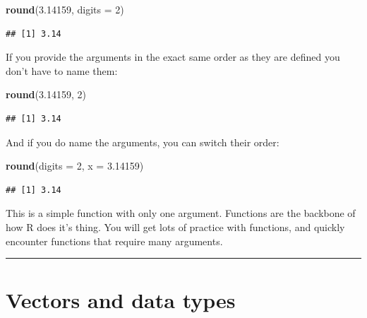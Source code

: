 \documentclass[
]{article}
\newenvironment{Shaded}{\begin{snugshade}}{\end{snugshade}}
\newcommand{\DataTypeTok}[1]{\textcolor[rgb]{0.13,0.29,0.53}{#1}}
\newcommand{\DecValTok}[1]{\textcolor[rgb]{0.00,0.00,0.81}{#1}}
\newcommand{\FloatTok}[1]{\textcolor[rgb]{0.00,0.00,0.81}{#1}}
\newcommand{\KeywordTok}[1]{\textcolor[rgb]{0.13,0.29,0.53}{\textbf{#1}}}
\newcommand{\NormalTok}[1]{#1}
\begin{document}
\begin{Shaded}
\begin{Highlighting}[]
\KeywordTok{round}\NormalTok{(}\FloatTok{3.14159}\NormalTok{, }\DataTypeTok{digits =} \DecValTok{2}\NormalTok{)}
\end{Highlighting}
\end{Shaded}

\begin{verbatim}
## [1] 3.14
\end{verbatim}

If you provide the arguments in the exact same order as they are defined
you don't have to name them:

\begin{Shaded}
\begin{Highlighting}[]
\KeywordTok{round}\NormalTok{(}\FloatTok{3.14159}\NormalTok{, }\DecValTok{2}\NormalTok{)}
\end{Highlighting}
\end{Shaded}

\begin{verbatim}
## [1] 3.14
\end{verbatim}

And if you do name the arguments, you can switch their order:

\begin{Shaded}
\begin{Highlighting}[]
\KeywordTok{round}\NormalTok{(}\DataTypeTok{digits =} \DecValTok{2}\NormalTok{, }\DataTypeTok{x =} \FloatTok{3.14159}\NormalTok{)}
\end{Highlighting}
\end{Shaded}

\begin{verbatim}
## [1] 3.14
\end{verbatim}

This is a simple function with only one argument. Functions are the
backbone of how R does it's thing. You will get lots of practice with
functions, and quickly encounter functions that require many arguments.

\begin{center}\rule{0.5\linewidth}{0.5pt}\end{center}

\hypertarget{vectors-and-data-types}{%
\section{Vectors and data types}\label{vectors-and-data-types}}
\end{document}
